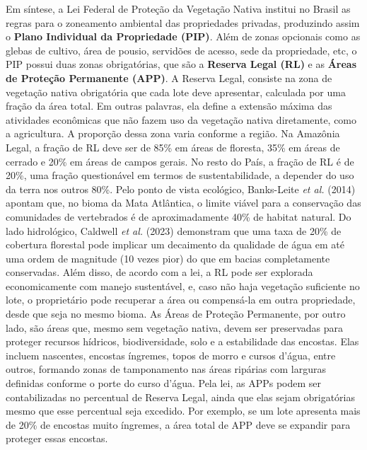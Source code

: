 \documentclass[./main.tex]{subfiles}
\begin{document}
\par Em síntese, a Lei Federal de Proteção da Vegetação Nativa institui no Brasil as regras para o zoneamento ambiental das propriedades privadas, produzindo assim o \textbf{Plano Individual da Propriedade (PIP)}. Além de zonas opcionais como as glebas de cultivo, área de pousio, servidões de acesso, sede da propriedade, etc, o PIP possui duas zonas obrigatórias, que são a \textbf{Reserva Legal (RL)} e as \textbf{Áreas de Proteção Permanente (APP)}. A Reserva Legal, consiste na zona de vegetação nativa obrigatória que cada lote deve apresentar, calculada por uma fração da área total. Em outras palavras, ela define a extensão máxima das atividades econômicas que não fazem uso da vegetação nativa diretamente, como a agricultura. A proporção dessa zona varia conforme a região. Na Amazônia Legal, a fração de RL deve ser de 85\% em áreas de floresta, 35\% em áreas de cerrado e 20\% em áreas de campos gerais. No resto do País, a fração de RL é de 20\%, uma fração questionável em termos de sustentabilidade, a depender do uso da terra nos outros 80\%. Pelo ponto de vista ecológico, Banks-Leite \textit{et al.} (2014) \cite{Banks-leite2014a} apontam que, no bioma da Mata Atlântica, o limite viável para a conservação das comunidades de vertebrados é de aproximadamente 40\% de habitat natural. Do lado hidrológico, Caldwell \textit{et al.} (2023) \cite{Caldwell2023} demonstram que uma taxa de 20\% de cobertura florestal pode implicar um decaimento da qualidade de água em até uma ordem de magnitude (10 vezes pior) do que em bacias completamente conservadas. Além disso, de acordo com a lei, a RL pode ser explorada economicamente com manejo sustentável, e, caso não haja vegetação suficiente no lote, o proprietário pode recuperar a área ou compensá-la em outra propriedade, desde que seja no mesmo bioma. As Áreas de Proteção Permanente, por outro lado, são áreas que, mesmo sem vegetação nativa, devem ser preservadas para proteger recursos hídricos, biodiversidade, solo e a estabilidade das encostas. Elas incluem nascentes, encostas íngremes, topos de morro e cursos d'água, entre outros, formando zonas de tamponamento nas áreas ripárias com larguras definidas conforme o porte do curso d'água. Pela lei, as APPs podem ser contabilizadas no percentual de Reserva Legal, ainda que elas sejam obrigatórias mesmo que esse percentual seja excedido. Por exemplo, se um lote apresenta mais de 20\% de encostas muito íngremes, a área total de APP deve se expandir para proteger essas encostas.
\end{document}
